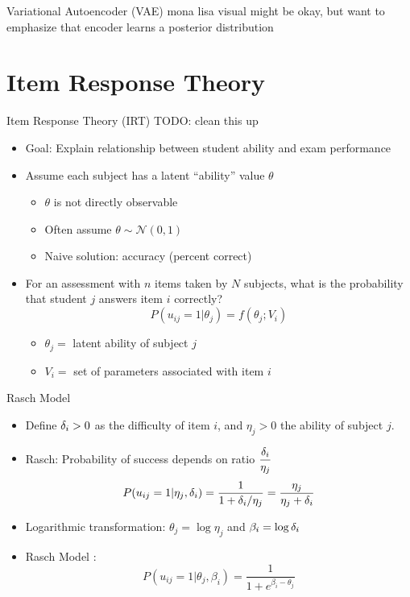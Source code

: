 \documentclass{beamer}
\def \d{\ensuremath \delta}
\theoremstyle{definition}
\begin{document}
\begin{frame}{Variational Autoencoder (VAE)}
  mona lisa visual might be okay, but want to emphasize that encoder learns a posterior distribution
\end{frame}

\section{Item Response Theory}

\begin{frame}{Item Response Theory (IRT)}
  TODO: clean this up %
\begin{itemize}
  \item Goal: Explain relationship between student ability and exam performance
  \item Assume each subject has a latent ``ability'' value $\theta$
  \begin{itemize}
    \item<2-> $\theta$ is not directly observable
    \item<2-> Often assume $\theta \sim \mathcal{N}(0,1)$
    \item<2-> Naive solution: accuracy (percent correct)
  \end{itemize}
  \item<3> For an assessment with $n$ items taken by $N$ subjects, what is the probability that student $j$ answers item $i$ correctly?
  \[P(u_{ij}=1 | \theta_j) = f(\theta_j; V_i)\]
  \begin{itemize}
    \item<3> $\theta_j =$ latent ability of subject $j$
    \item<3> $V_i =$ set of parameters associated with item $i$
  \end{itemize}
\end{itemize}
\end{frame}

\begin{frame}{Rasch Model}
\begin{itemize}
  \item Define $\d_i > 0$ as the difficulty of item $i$, and $\eta_j > 0$ the ability of subject $j$.
  \item Rasch: Probability of success depends on ratio $\displaystyle \frac{\d_i}{\eta_j}$
    \[P(u_{ij} = 1 | \eta_j, \d_i) = \frac{1}{1 + \d_i/\eta_j} = \frac{\eta_j}{\eta_j + \d_i}\]
  \item Logarithmic transformation: $\theta_j = \log \eta_j$ and $\beta_i = \log \d_i$
  \item Rasch Model :
    \[P(u_{ij} = 1 | \theta_j, \beta_i) = \frac{1}{1 + e^{\beta_i - \theta_j}}\]
\end{itemize}
\end{frame}
\end{document}
